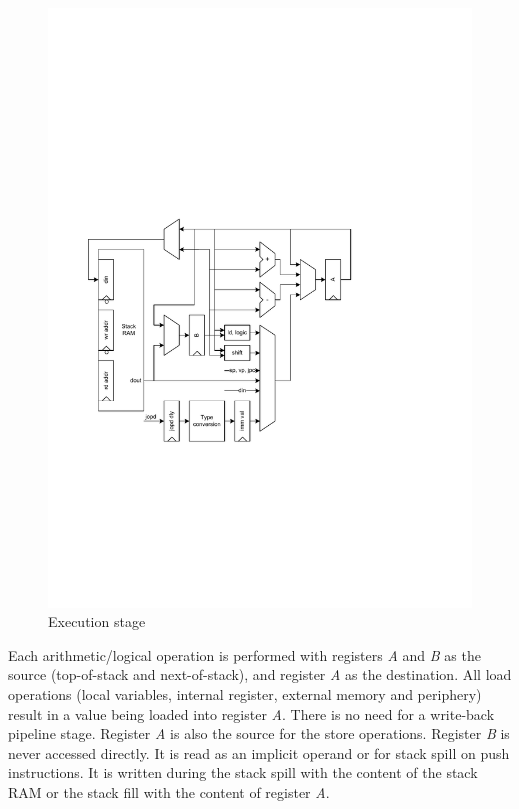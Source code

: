 \begin{figure}[t]
    \centering
    \includegraphics[scale=\picscale]{arch/arch_execute}
    \caption{Execution stage}
    \label{fig_arch_exe}
\end{figure}

Each arithmetic/logical operation is performed with registers
\emph{A} and \emph{B} as the source (top-of-stack and next-of-stack),
and register \emph{A} as the destination. All load operations (local
variables, internal register, external memory and periphery) result
in a value being loaded into register \emph{A}. There is no need for
a write-back pipeline stage. Register \emph{A} is also the source for
the store operations. Register \emph{B} is never accessed directly.
It is read as an implicit operand or for stack spill on push
instructions. It is written during the stack spill with the content
of the stack RAM or the stack fill with the content of register
\emph{A}.

